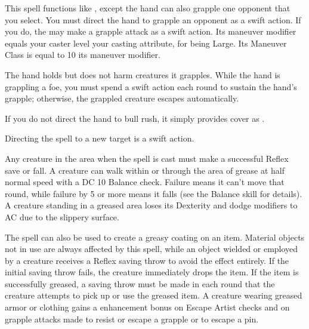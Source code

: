 \begin{spelleffect}
  This spell functions like , except the hand can also grapple one opponent that you select. You must direct the hand to grapple an opponent as a swift action. If you do, the  may make a grapple attack as a swift action. Its maneuver modifier equals your caster level \add your casting attribute,  for being Large. Its Maneuver Class is equal to 10 \add its maneuver modifier.
  \par The hand holds but does not harm creatures it grapples. While the hand is grappling a foe, you must spend a swift action each round to sustain the hand's grapple; otherwise, the grappled creature escapes automatically.
  \par If you do not direct the hand to bull rush, it simply provides cover as .
\end{spelleffect}
\begin{spellnotes}
  Directing the spell to a new target is a swift action.
\end{spellnotes}

\spellrng{\rngclose}
\begin{spelleffect}
  Any creature in the area when the spell is cast must make a successful Reflex save or fall. A creature can walk within or through the area of grease at half normal speed with a DC 10 Balance check. Failure means it can't move that round, while failure by 5 or more means it falls (see the Balance skill for details). A creature standing in a greased area loses its Dexterity and dodge modifiers to AC due to the slippery surface.
  \par The spell can also be used to create a greasy coating on an item. Material objects not in use are always affected by this spell, while an object wielded or employed by a creature receives a Reflex saving throw to avoid the effect entirely. If the initial saving throw fails, the creature immediately drops the item. If the item is successfully greased, a saving throw must be made in each round that the creature attempts to pick up or use the greased item. A creature wearing greased armor or clothing gains a  enhancement bonus on Escape Artist checks and on grapple attacks made to resist or escape a grapple or to escape a pin.
\end{spelleffect}

